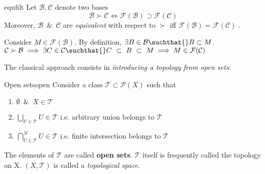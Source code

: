 \begin{myprop}{}{equfilt}
	Let $ \mathcal{B}, \mathcal{C}$ denote two bases
	$$ \mathcal{B}\succ \mathcal{C} \iff \mathcal{F}(\mathcal{B}) \supset \mathcal{F}( \mathcal{C}) $$
	Moreover, $\mathcal{B} \enspace \& \enspace \mathcal{C}$ are \textit{equivalent} with respect to $\succ$ iff $\mathcal{F}(\mathcal{B}) = \mathcal{F}( \mathcal{C})$ .
\end{myprop}
\begin{myproof}
	Consider $M\in \mathcal{F}( \mathcal{B} )$. By definition, $\exists B \in \mathcal{B} \suchthat{} B \subset M$. \quad $\mathcal{C} \succ  \mathcal{B} \implies \exists C \in \mathcal{C} \suchthat{} C~\subset~B~\subset~M \implies M \in \mathcal{F}( \mathcal{C} )$ 
\end{myproof}

The classical approach consists in \textit{introducing a topology from open sets}:
\begin{mydef}{Open sets}{open}
	Consider a class $\mathcal{T}\subset \mathcal{P}(X)$ such that
	\begin{enumerate}[label=\roman*.]
		\item $\emptyset{} \enspace \& \enspace X \in \mathcal{T}$
		\item $\bigcup\limits_{U\in \mathcal{T}} U \in \mathcal{T}$ i.e. arbitrary union belongs to $\mathcal{T}$
		\item $\bigcap\limits_{U\in \mathcal{T}}^{N} U \in \mathcal{T}$ i.e. finite intersection belongs to $\mathcal{T}$
	\end{enumerate}
	The elements of $\mathcal{T}$ are called \textbf{open sets}. $\mathcal{T}$ itself is frequently called the topology on X. $(X, \mathcal{T})$ is called a \textit{topological space}.
\end{mydef}

